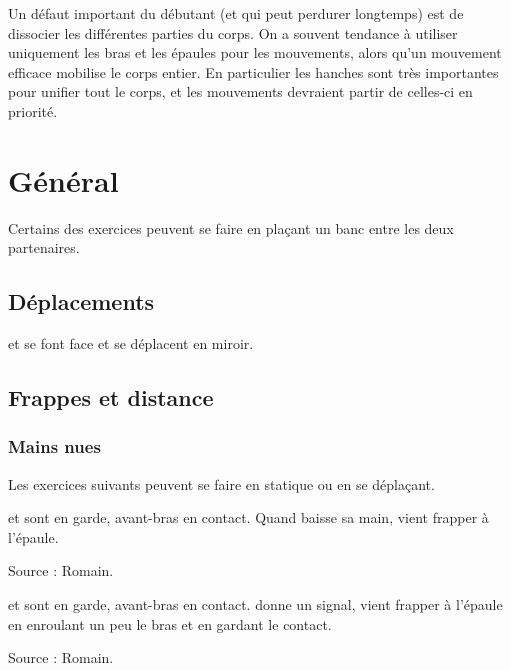 Un défaut important du débutant (et qui peut perdurer longtemps) est de dissocier les différentes parties du corps.
On a souvent tendance à utiliser uniquement les bras et les épaules pour les mouvements, alors qu'un mouvement efficace mobilise le corps entier.
En particulier les hanches sont très importantes pour unifier tout le corps, et les mouvements devraient partir de celles-ci en priorité.


\section{Général}

Certains des exercices peuvent se faire en plaçant un banc entre les deux partenaires.


\subsection{Déplacements}


\begin{exercice}
\label{ex:general:miroir}

\A et \D se font face et se déplacent en miroir.
\end{exercice}


\subsection{Frappes et distance}


\subsubsection{Mains nues}


Les exercices suivants peuvent se faire en statique ou en se déplaçant.


\begin{exercice}
\label{struct:ex:contact:frappe-signal}

\A et \D sont en garde, avant-bras en contact.
Quand \A baisse sa main, \D vient frapper à l'épaule.

Source : Romain.

\end{exercice}


\begin{exercice}

\A et \D sont en garde, avant-bras en contact.
\A donne un signal, \D vient frapper à l'épaule en enroulant un peu le bras et en gardant le contact.

Source : Romain.

\end{exercice}



